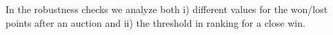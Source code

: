 In the robustness checks we analyze both i) different values for the won/lost points after an auction and ii) the threshold in ranking for a close win.
\clearpage

